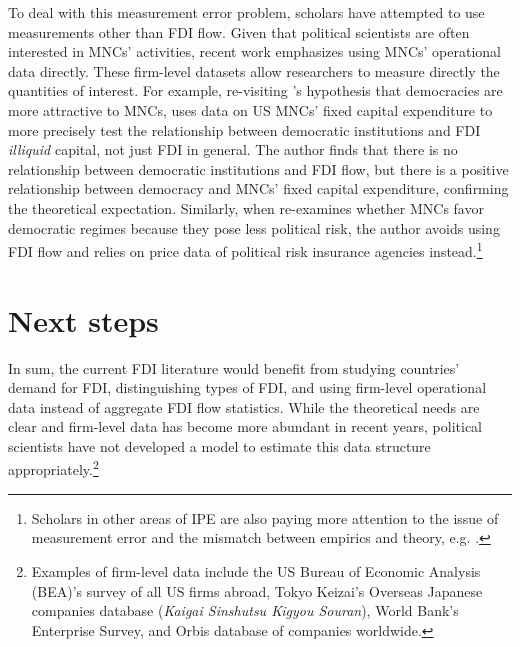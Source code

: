 To deal with this measurement error problem, scholars have attempted to use
measurements other than FDI flow. Given that political scientists are often
interested in MNCs' activities, recent work emphasizes using MNCs' operational
data directly. These firm-level datasets allow researchers to measure directly
the quantities of interest. For example, re-visiting \citet{Li2009a}'s
hypothesis that democracies are more attractive to MNCs, \citet{Kerner2014} uses
data on US MNCs' fixed capital expenditure to more precisely test the
relationship between democratic institutions and FDI \textit{illiquid} capital,
not just FDI in general. The author finds that there is no relationship between
democratic institutions and FDI flow, but there is a positive relationship
between democracy and MNCs' fixed capital expenditure, confirming the
theoretical expectation. Similarly, when \citet{Jensen2008a} re-examines whether
MNCs favor democratic regimes because they pose less political risk, the author
avoids using FDI flow and relies on price data of political risk insurance
agencies instead.\footnote{Scholars in other areas of IPE are also paying more
  attention to the issue of measurement error and the mismatch between empirics
  and theory, e.g. \citet{Karcher2013}.}

\section{Next steps}

In sum, the current FDI literature would benefit from studying countries'
demand for FDI, distinguishing types of FDI, and using firm-level
operational data instead of aggregate FDI flow statistics. While the theoretical
needs are clear and firm-level data has become more abundant in recent years,
political scientists have not developed a model to estimate this data structure
appropriately.\footnote{Examples of firm-level data include the US Bureau of
  Economic Analysis (BEA)'s survey of all US firms abroad, Tokyo Keizai's
  Overseas Japanese companies database (\textit{Kaigai Sinshutsu Kigyou
    Souran}), World Bank's Enterprise Survey, and Orbis database of companies
  worldwide.}

